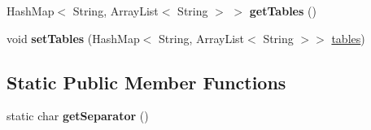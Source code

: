 \begin{DoxyCompactItemize}
\item 
\hypertarget{class_data_base_1_1_tables_abbcc329ed2c56e281f2ea3583c9978f2}{
HashMap$<$ String, ArrayList$<$ String $>$ $>$ {\bfseries getTables} ()}
\label{class_data_base_1_1_tables_abbcc329ed2c56e281f2ea3583c9978f2}

\item 
\hypertarget{class_data_base_1_1_tables_a85dff87c6a962b1e487723fe2e1fed1b}{
void {\bfseries setTables} (HashMap$<$ String, ArrayList$<$ String $>$$>$ \hyperlink{class_data_base_1_1_tables_ae6cd882f76e6474bd85b97b5013437ca}{tables})}
\label{class_data_base_1_1_tables_a85dff87c6a962b1e487723fe2e1fed1b}

\end{DoxyCompactItemize}
\subsection*{Static Public Member Functions}
\begin{DoxyCompactItemize}
\item 
\hypertarget{class_data_base_1_1_tables_a6684d2d0eea49d73e40c7beb8d2c5c8d}{
static char {\bfseries getSeparator} ()}
\label{class_data_base_1_1_tables_a6684d2d0eea49d73e40c7beb8d2c5c8d}

\end{DoxyCompactItemize}
